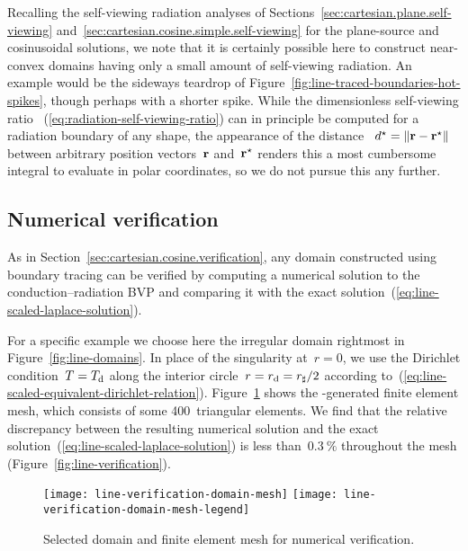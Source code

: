 Recalling the self-viewing radiation analyses
of Sections~\ref{sec:cartesian.plane.self-viewing}
and~\ref{sec:cartesian.cosine.simple.self-viewing}
for the plane-source and cosinusoidal solutions,
we note that it is certainly possible here
to construct near-convex domains
having only a small amount of self-viewing radiation.
An example would be the sideways teardrop
of Figure~\ref{fig:line-traced-boundaries-hot-spikes},
though perhaps with a shorter spike.
While the dimensionless self-viewing ratio~%
  (\ref{eq:radiation-self-viewing-ratio})
can in principle be computed for a radiation boundary of any shape,
the appearance of the distance~%
  $d^\star = \lVert\boldsymbol{\mathbf{r}} - \boldsymbol{\mathbf{r}}^\star\rVert$
between arbitrary position vectors~$\boldsymbol{\mathbf{r}}$ and~$\boldsymbol{\mathbf{r}}^\star$
renders this a most cumbersome integral to evaluate in polar coordinates,
so we do not pursue this any further.

\subsection{Numerical verification}
\label{sec:polar.convex.verification}

As in Section~\ref{sec:cartesian.cosine.verification},
any domain constructed using boundary tracing can be verified
by computing a numerical solution to the conduction--radiation BVP
and comparing it
with the exact solution~(\ref{eq:line-scaled-laplace-solution}).

For a specific example we choose here
the irregular domain rightmost in Figure~\ref{fig:line-domains}.
In place of the singularity at~$r = 0$,
we use the Dirichlet condition~$T = T_{\mathrm{d}}$
along the interior circle~$r = r_{\mathrm{d}} = r_\sharp / 2$
according to~(\ref{eq:line-scaled-equivalent-dirichlet-relation}).
Figure~\ref{fig:line-verification-domain-mesh}
shows the -generated finite element mesh,
which consists of some 400~triangular elements.
We find that the relative discrepancy
between the resulting numerical solution
and the exact solution~(\ref{eq:line-scaled-laplace-solution})
is less than~$\SI{0.3}{\percent}$ throughout the mesh
(Figure~\ref{fig:line-verification}).

\begin{figure}
  \centering
  \texttt{[image: line-verification-domain-mesh]}
  \texttt{[image: line-verification-domain-mesh-legend]}
  \caption{
    Selected domain and finite element mesh for numerical verification.
  }
  \label{fig:line-verification-domain-mesh}
\end{figure}

